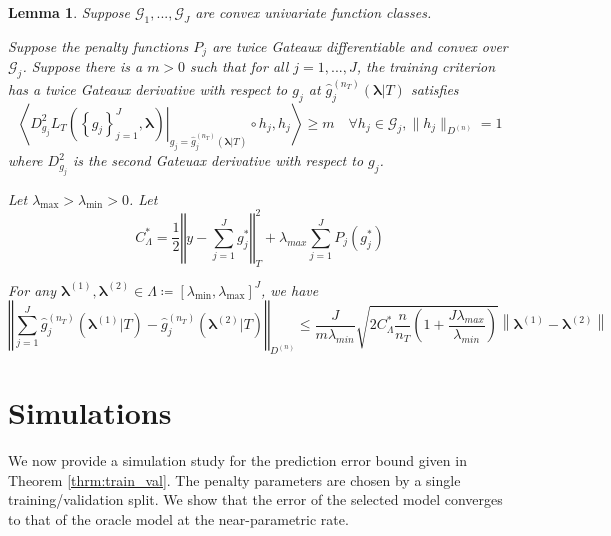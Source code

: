 \documentclass[12pt]{article}
\newtheorem{lemma}{Lemma}
\begin{document}
\begin{lemma}
\label{lemma:nonparam_smooth}
Suppose $\mathcal{G}_1, ..., \mathcal{G}_J$ are convex univariate function classes.

Suppose the penalty functions $P_{j}$ are twice Gateaux differentiable and convex over $\mathcal{G}_j$. Suppose there is a $m > 0$ such that for all $j=1,...,J$, the training criterion has a twice Gateaux derivative with respect to $g_j$ at $\hat{g}^{(n_T)}_j( \boldsymbol{\lambda} | T)$ satisfies
\begin{equation}
\left \langle 
\left . D^2_{g_j} L_T \left ( \left \{ g_j \right \}_{j=1}^J, \boldsymbol{\lambda} \right ) \right |_{g_j= \hat{g}^{(n_T)}_j( \boldsymbol{\lambda} | T) }
\circ h_j, h_j
\right \rangle 
\ge m
\quad \forall h_j \in \mathcal{G}_j,  \|h_j \|_{D^{(n)}} = 1
\label{eq:gateuax}
\end{equation}
where $D^2_{g_j}$ is the second Gateuax derivative with respect to $g_j$.

Let $\lambda_{\max} > \lambda_{\min} > 0 $. Let
\begin{equation}
C_{\Lambda}^*=
\frac{1}{2}\left\Vert y- \sum_{j=1}^J g^*_j\right\Vert _{T}^{2}
+\lambda_{max}\sum_{j=1}^{J} P_{j}(g^*_j)
\end{equation}

For any $\boldsymbol{\lambda}^{(1)}, \boldsymbol{\lambda}^{(2)} \in \Lambda \coloneqq \left [ \lambda_{\min}, \lambda_{\max} \right ]^J$, we have
\begin{equation}
\label{eq:nonparam_lipshitz_thrm}
\left\Vert 
\sum_{j=1}^J \hat{g}_j^{(n_T)}\left(\boldsymbol{\lambda}^{(1)} |T \right)-\hat{g}_j^{(n_T)}\left(\boldsymbol{\lambda}^{(2)} |T \right)\right\Vert _{D^{(n)}}
\le
\frac{J}{m \lambda_{min}}\sqrt{2 C_{\Lambda}^* \frac{n}{n_{T}}\left(1+\frac{J\lambda_{max}}{\lambda_{min}}\right)}
\left \|\boldsymbol{\lambda}^{(1)}-\boldsymbol{\lambda}^{(2)} \right \|
\end{equation}
\end{lemma}


\section{Simulations}\label{sec:simulations}

We now provide a simulation study for the prediction error bound given in Theorem \ref{thrm:train_val}. The penalty parameters are chosen by a single training/validation split. We show that the error of the selected model converges to that of the oracle model at the near-parametric rate.
\end{document}
